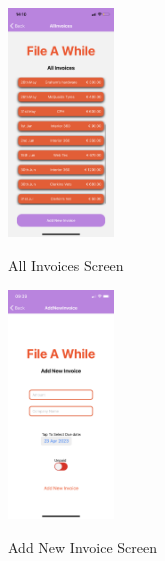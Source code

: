 \begin{figure}[h!]
    \includegraphics[width=0.25\textwidth]
    {images/AllInvoice.png}
    \centering
    \label{image:allinvoice}
    \caption{All Invoices Screen}
\end{figure}
\begin{figure}[h!]
    \includegraphics[width=0.25\textwidth]
    {images/Adding.png}
    \centering
    \label{image:create}
    \caption{Add New Invoice Screen}
\end{figure}

